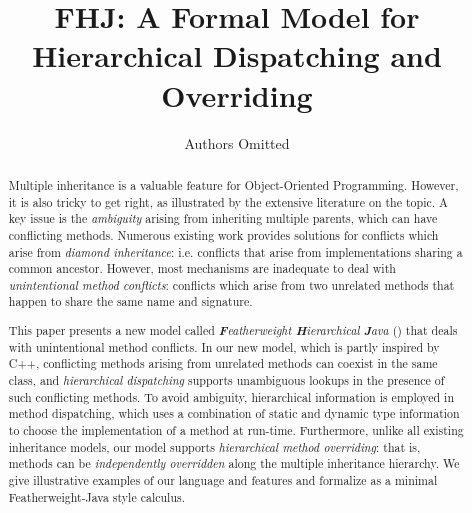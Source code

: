 \documentclass[a4paper,english]{lipics-v2016}
\title{FHJ: A Formal Model for Hierarchical Dispatching and Overriding}
\author{Authors Omitted}
\affil{}
\begin{document}
\maketitle

\begin{abstract}
Multiple inheritance is a valuable feature for Object-Oriented
Programming. However, it is also tricky to get right, as illustrated by
the extensive literature on the topic. A key issue 
is the \emph{ambiguity} arising from inheriting multiple parents,
which can have conflicting methods. 
Numerous existing work provides solutions for 
conflicts which arise from \emph{diamond inheritance}: i.e.
conflicts that arise from implementations sharing a common 
ancestor. However, most mechanisms are inadequate to deal 
with \emph{unintentional method conflicts}: conflicts which 
arise from two unrelated methods that happen to share the same name
and signature. 

\begin{comment}
One of the most promising 
approaches to multiple inheritance is the \emph{trait} model. Traits offer a
restricted model of multiple inheritance that is easy to reason and 
have many elegant properties. Traits have good support for method 
conflicts which arise from \emph{diamond inheritance}:
conflicts that arise from method implementations sharing a common 
ancestor. However, the mechanisms of traits are inadequate to deal 
with \emph{unintentional method conflicts}: conflicts which 
arise from two unrelated methods that happen to share the same name
and signature. 
\end{comment}

This paper presents a new model called \emph{\textbf{F}eatherweight
  \textbf{H}ierarchical \textbf{J}ava} (\name{}) that deals with
unintentional method conflicts.  In our new model, which is partly
inspired by C++, conflicting methods arising from unrelated methods
can coexist in the same class, and \emph{hierarchical dispatching}
supports unambiguous lookups in the presence of such conflicting
methods.  To avoid ambiguity, hierarchical information is employed in
method dispatching, which uses a combination of static and dynamic
type information to choose the implementation of a method at run-time.
Furthermore, unlike all existing inheritance models, our model
supports \emph{hierarchical method overriding}: that is, methods can
be \emph{independently overridden} along the multiple inheritance
hierarchy. We give illustrative examples of our language and features
and formalize \name{} as a minimal Featherweight-Java style calculus.

\begin{comment}
Furthermore we discuss similarities and differences to 


What ensures unambiguity is the use of information about
the class hierarchy.

\name{} is partly inspired by the method resolution semantics
of C++, but it also incoorporates ideas from the trait model and Java
8's default methods. We discuss the similarities
and differences with and also advantages and disadvantages. 
\end{comment}

 \end{abstract}
\end{document}
